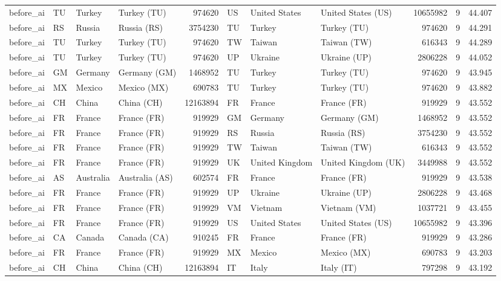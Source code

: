 \begin{tabular}{llllrlllrrr}
before\_ai & TU & Turkey & Turkey (TU) & 974620 & US & United States & United States (US) & 10655982 & 9 & 44.407 \\
before\_ai & RS & Russia & Russia (RS) & 3754230 & TU & Turkey & Turkey (TU) & 974620 & 9 & 44.291 \\
before\_ai & TU & Turkey & Turkey (TU) & 974620 & TW & Taiwan & Taiwan (TW) & 616343 & 9 & 44.289 \\
before\_ai & TU & Turkey & Turkey (TU) & 974620 & UP & Ukraine & Ukraine (UP) & 2806228 & 9 & 44.052 \\
before\_ai & GM & Germany & Germany (GM) & 1468952 & TU & Turkey & Turkey (TU) & 974620 & 9 & 43.945 \\
before\_ai & MX & Mexico & Mexico (MX) & 690783 & TU & Turkey & Turkey (TU) & 974620 & 9 & 43.882 \\
before\_ai & CH & China & China (CH) & 12163894 & FR & France & France (FR) & 919929 & 9 & 43.552 \\
before\_ai & FR & France & France (FR) & 919929 & GM & Germany & Germany (GM) & 1468952 & 9 & 43.552 \\
before\_ai & FR & France & France (FR) & 919929 & RS & Russia & Russia (RS) & 3754230 & 9 & 43.552 \\
before\_ai & FR & France & France (FR) & 919929 & TW & Taiwan & Taiwan (TW) & 616343 & 9 & 43.552 \\
before\_ai & FR & France & France (FR) & 919929 & UK & United Kingdom & United Kingdom (UK) & 3449988 & 9 & 43.552 \\
before\_ai & AS & Australia & Australia (AS) & 602574 & FR & France & France (FR) & 919929 & 9 & 43.538 \\
before\_ai & FR & France & France (FR) & 919929 & UP & Ukraine & Ukraine (UP) & 2806228 & 9 & 43.468 \\
before\_ai & FR & France & France (FR) & 919929 & VM & Vietnam & Vietnam (VM) & 1037721 & 9 & 43.455 \\
before\_ai & FR & France & France (FR) & 919929 & US & United States & United States (US) & 10655982 & 9 & 43.396 \\
before\_ai & CA & Canada & Canada (CA) & 910245 & FR & France & France (FR) & 919929 & 9 & 43.286 \\
before\_ai & FR & France & France (FR) & 919929 & MX & Mexico & Mexico (MX) & 690783 & 9 & 43.203 \\
before\_ai & CH & China & China (CH) & 12163894 & IT & Italy & Italy (IT) & 797298 & 9 & 43.192 \\

\end{tabular}
